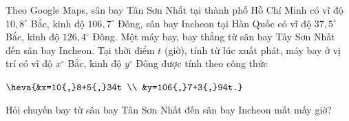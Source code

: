 \begin{bt}%
	Theo Google Maps, sân bay Tân Sơn Nhất tại thành phố Hồ Chí Minh có vĩ độ $10{,}8^\circ$ Bắc, kinh độ $106{,}7^\circ$ Đông, sân bay Incheon tại Hàn Quốc có vĩ độ $37{,}5^\circ$ Bắc, kinh độ $126{,}4^\circ$ Đông. Một máy bay, bay thẳng từ sân bay Tây Sơn Nhất đến sân bay Incheon. Tại thời điểm $t$ (giờ), tính từ lúc xuất phát, máy bay ở vị trí có vĩ độ $x^\circ$ Bắc, kinh độ $y^\circ$ Đông được tính theo công thức
	\begin{center}
		$\heva{&x=10{,}8+5{,}34t \\ &y=106{,}7+3{,}94t.}$
	\end{center}
	Hỏi chuyến bay từ sân bay Tân Sơn Nhất đến sân bay Incheon mất mấy giờ?
\end{bt}


